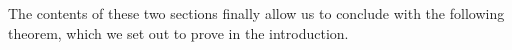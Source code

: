 


The contents of these two sections finally allow us to conclude with the following theorem, which we set out to prove in the introduction. 


